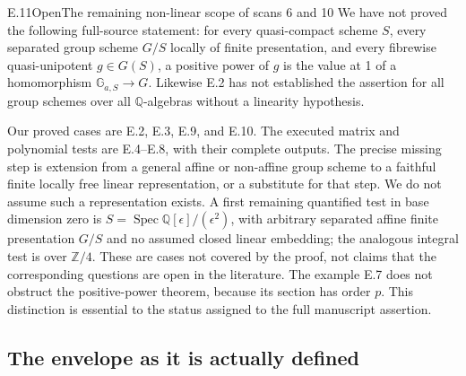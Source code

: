 \begin{statement}{E.11}{Open}{The remaining non-linear scope of scans 6 and 10}
We have not proved the following full-source statement:
for every quasi-compact scheme \(S\), every separated group scheme
\(G/S\) locally of finite presentation, and every fibrewise
quasi-unipotent \(g\in G(S)\), a positive power of \(g\) is the
value at 1 of a homomorphism \(\mathbb G_{a,S}\to G\).
Likewise E.2 has not established the assertion for all group
schemes over all \(\mathbb Q\)-algebras without a linearity hypothesis.
\end{statement}
\noindent
Our proved cases are E.2, E.3, E.9, and E.10.  The executed matrix
and polynomial tests are E.4--E.8, with their complete outputs.
The precise missing step is extension from a general affine or
non-affine group scheme to a faithful finite locally free linear
representation, or a substitute for that step.  We do not assume
such a representation exists.  A first remaining quantified test
in base dimension zero is \(S=\operatorname{Spec}
\mathbb Q[\epsilon]/(\epsilon^2)\), with arbitrary separated affine
finite presentation \(G/S\) and no assumed closed linear embedding;
the analogous integral test is over \(\mathbb Z/4\).
These are cases not covered by the proof, not claims that the
corresponding questions are open in the literature.  The example
E.7 does not obstruct the positive-power theorem, because its
section has order \(p\).  This distinction is essential to the status
assigned to the full manuscript assertion.

\subsection{The envelope as it is actually defined}

